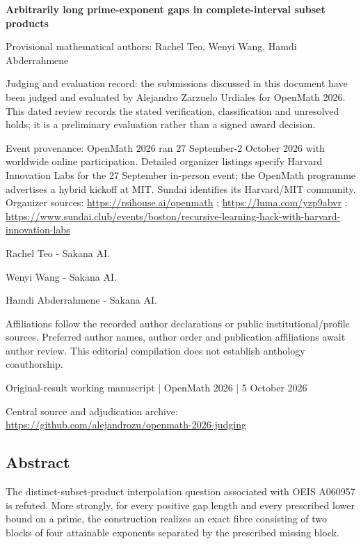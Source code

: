 \documentclass[11pt,a4paper]{article}
\begin{document}
{\LARGE\bfseries Arbitrarily long prime-exponent gaps in complete-interval subset products\par}\medskip
{\small Provisional mathematical authors: Rachel Teo, Wenyi Wang, Hamdi Abderrahmene\par}\medskip
{\small Judging and evaluation record: the submissions discussed in this document have been judged and evaluated by Alejandro Zarzuelo Urdiales for OpenMath 2026. This dated review records the stated verification, classification and unresolved holds; it is a preliminary evaluation rather than a signed award decision.\par}

{\small Event provenance: OpenMath 2026 ran 27 September-2 October 2026 with worldwide online participation. Detailed organizer listings specify Harvard Innovation Labs for the 27 September in-person event; the OpenMath programme advertises a hybrid kickoff at MIT. Sundai identifies its Harvard/MIT community. Organizer sources: \url{https://rsihouse.ai/openmath} ; \url{https://luma.com/yzp9abvr} ; \url{https://www.sundai.club/events/boston/recursive-learning-hack-with-harvard-innovation-labs}\par}

{\small Rachel Teo  -  Sakana AI.\par}

{\small Wenyi Wang  -  Sakana AI.\par}

{\small Hamdi Abderrahmene  -  Sakana AI.\par}

{\small Affiliations follow the recorded author declarations or public institutional/profile sources. Preferred author names, author order and publication affiliations await author review. This editorial compilation does not establish anthology coauthorship.\par}

{\small Original-result working manuscript | OpenMath 2026 | 5 October 2026\par}\medskip
{\small Central source and adjudication archive: \url{https://github.com/alejandrozu/openmath-2026-judging}\par}

\subsection{Abstract}
The distinct-subset-product interpolation question associated with OEIS A060957 is refuted. More strongly, for every positive gap length and every prescribed lower bound on a prime, the construction realizes an exact fibre consisting of two blocks of four attainable exponents separated by the prescribed missing block.
\end{document}
